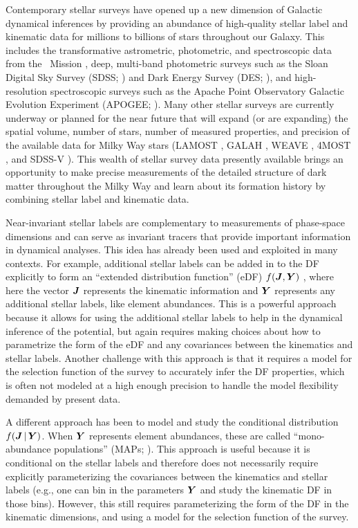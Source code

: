 Contemporary stellar surveys have opened up a new dimension of Galactic dynamical
inferences by providing an abundance of high-quality stellar label and kinematic data
for millions to billions of stars throughout our Galaxy.
This includes the transformative astrometric, photometric, and spectroscopic data from
the \gaia\ Mission \citep{Gaia:2016, Gaia:2023}, deep, multi-band photometric
surveys such as the Sloan Digital Sky Survey (SDSS; \citealt{York:2000}) and Dark Energy
Survey (DES; \citealt{DES:2016}), and high-resolution spectroscopic surveys such as the
Apache Point Observatory Galactic Evolution Experiment (APOGEE; \citealt{APOGEE:2017}).
Many other stellar surveys are currently underway or planned for the near future that
will expand (or are expanding) the spatial volume, number of stars, number of measured
properties, and precision of the available data for Milky Way stars (LAMOST
\citealt{LAMOST:2022}, GALAH \citealt{DeSilva:2015, Buder:2022}, WEAVE
\citealt{WEAVE:2023}, 4MOST \citealt{deJong:2019}, and SDSS-V \citealt{Kollmeier:2017}).
This wealth of stellar survey data presently available brings an opportunity to make
precise measurements of the detailed structure of dark matter throughout the Milky Way
and learn about its formation history by combining stellar label and kinematic data.

Near-invariant stellar labels are complementary to measurements of phase-space
dimensions and can serve as invariant tracers that provide important information in
dynamical analyses.
This idea has already been used and exploited in many contexts.
For example, additional stellar labels can be added in to the DF explicitly to form an
``extended distribution function'' (eDF) $f(\boldsymbol{J}, \boldsymbol{Y})$
\citep[e.g.,][]{Sanders:2015, Binney:2023}, where here the vector $\boldsymbol{J}$ represents
the kinematic information and $\boldsymbol{Y}$ represents any additional stellar labels, like
element abundances.
This is a powerful approach because it allows for using the additional stellar labels to
help in the dynamical inference of the potential, but again requires making choices
about how to parametrize the form of the eDF and any covariances between the kinematics
and stellar labels.
Another challenge with this approach is that it requires a model for the selection
function of the survey to accurately infer the DF properties, which is often not modeled
at a high enough precision to handle the model flexibility demanded by present data.

A different approach has been to model and study the conditional distribution $f(\boldsymbol{J}
\,|\, \boldsymbol{Y})$.
When $\boldsymbol{Y}$ represents element abundances, these are called ``mono-abundance
populations'' (MAPs; \citealt{Bovy:2012,Bovy:2016}).
This approach is useful because it is conditional on the stellar labels and therefore
does not necessarily require explicitly parameterizing the covariances between the
kinematics and stellar labels (e.g., one can bin in the parameters $\boldsymbol{Y}$ and study
the kinematic DF in those bins).
However, this still requires parameterizing the form of the DF in the kinematic
dimensions, and using a model for the selection function of the survey.

